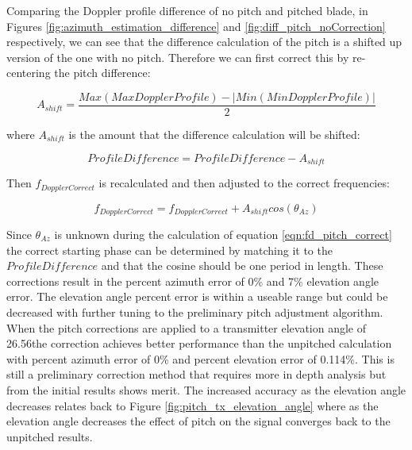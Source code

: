 Comparing the Doppler profile difference of no pitch and pitched blade, in Figures \ref{fig:azimuth_estimation_difference} and \ref{fig:diff_pitch_noCorrection} respectively, we can see that the difference calculation of the pitch is a shifted up version of the one with no pitch. Therefore we can first correct this by re-centering the pitch difference: 

\begin{equation}
	A_{shift} = \frac{Max(Max Doppler Profile) - |Min(Min Doppler Profile)|}{2}
	\label{eqn:pitch_shift}
\end{equation}

where $A_{shift}$ is the amount that the difference calculation will be shifted:

\begin{equation}
	ProfileDifference = ProfileDifference - A_{shift}
	\label{eqn:diff_shift}
\end{equation}

Then $f_{DopplerCorrect}$ is recalculated and then adjusted to the correct frequencies:

\begin{equation}
	f_{DopplerCorrect} = f_{DopplerCorrect} + A_{shift}cos\left(\theta_{Az}\right)
	\label{eqn:fd_pitch_correct}
\end{equation}

Since $\theta_{Az}$ is unknown during the calculation of equation \ref{eqn:fd_pitch_correct} the correct starting phase can be determined by matching it to the $ProfileDifference$ and that the cosine should be one period in length. These corrections result in the percent azimuth error of 0\% and 7\% elevation angle error. The elevation angle percent error is within a useable range but could be decreased with further tuning to the preliminary pitch adjustment algorithm. When the pitch corrections are applied to a transmitter elevation angle of 26.56\textdegree \space the correction achieves better performance than the unpitched calculation with percent azimuth error of 0\% and percent elevation error of 0.114\%. This is still a preliminary correction method that requires more in depth analysis but from the initial results shows merit. The increased accuracy as the elevation angle decreases relates back to Figure \ref{fig:pitch_tx_elevation_angle} where as the elevation angle decreases the effect of pitch on the signal converges back to the unpitched results.



